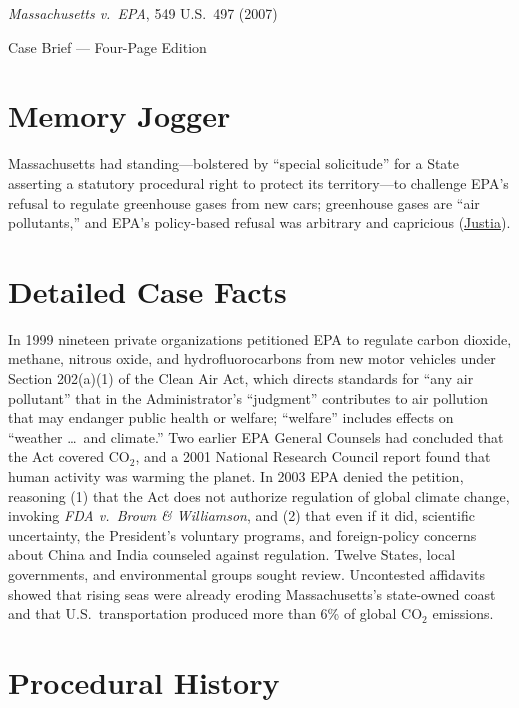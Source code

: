 \documentclass[12pt]{article}
\begin{document}
\begin{center}
{\LARGE \textit{Massachusetts v.\ EPA}, 549 U.S.\ 497 (2007)\par}
\vspace{0.8em}
{\large Case Brief --- Four-Page Edition\par}
\end{center}
\vspace{1em}

\section{Memory Jogger}

Massachusetts had standing---bolstered by ``special solicitude'' for a State asserting a statutory procedural right to protect its territory---to challenge EPA's refusal to regulate greenhouse gases from new cars; greenhouse gases are ``air pollutants,'' and EPA's policy-based refusal was arbitrary and capricious (\href{https://supreme.justia.com/cases/federal/us/549/497/}{Justia}).

\section{Detailed Case Facts}

In 1999 nineteen private organizations petitioned EPA to regulate carbon dioxide, methane, nitrous oxide, and hydrofluorocarbons from new motor vehicles under Section 202(a)(1) of the Clean Air Act, which directs standards for ``any air pollutant'' that in the Administrator's ``judgment'' contributes to air pollution that may endanger public health or welfare; ``welfare'' includes effects on ``weather \ldots\ and climate.'' Two earlier EPA General Counsels had concluded that the Act covered $\mathrm{CO_2}$, and a 2001 National Research Council report found that human activity was warming the planet. In 2003 EPA denied the petition, reasoning (1) that the Act does not authorize regulation of global climate change, invoking \textit{FDA v.\ Brown \& Williamson}, and (2) that even if it did, scientific uncertainty, the President's voluntary programs, and foreign-policy concerns about China and India counseled against regulation. Twelve States, local governments, and environmental groups sought review. Uncontested affidavits showed that rising seas were already eroding Massachusetts's state-owned coast and that U.S.\ transportation produced more than 6\% of global $\mathrm{CO_2}$ emissions.

\section{Procedural History}
\end{document}
